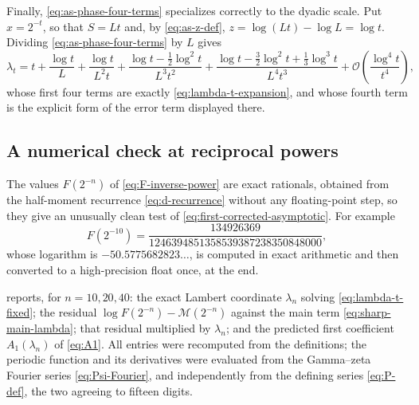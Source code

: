 \documentclass[11pt,oneside]{article}
\theoremstyle{definition}
\theoremstyle{remark}
\newcommand{\bigO}{\mathcal O}
\begin{document}
Finally, \eqref{eq:as-phase-four-terms} specializes correctly to the dyadic scale.  Put
$x=2^{-t}$, so that $S=Lt$ and, by \eqref{eq:as-z-def}, $z=\log(Lt)-\log L=\log t$.  Dividing
\eqref{eq:as-phase-four-terms} by $L$ gives
\begin{equation}
 \lambda_t=t+\frac{\log t}{L}+\frac{\log t}{L^{2}t}
 +\frac{\log t-\tfrac12\log^{2}t}{L^{3}t^{2}}
 +\frac{\log t-\tfrac32\log^{2}t+\tfrac13\log^{3}t}{L^{4}t^{3}}
 +\bigO\!\left(\frac{\log^{4}t}{t^{4}}\right),            \label{eq:as-phase-dyadic}
\end{equation}
whose first four terms are exactly \eqref{eq:lambda-t-expansion}, and whose fourth term is
the explicit form of the error term displayed there.


\subsection{A numerical check at reciprocal powers}
\label{subsec:as-numerics}

The values $F(2^{-n})$ of \eqref{eq:F-inverse-power} are exact rationals, obtained from the
half-moment recurrence \eqref{eq:d-recurrence} without any floating-point step, so they give
an unusually clean test of \eqref{eq:first-corrected-asymptotic}.  For example
\begin{equation}
 F(2^{-10})=\frac{134926369}{1246394851358539387238350848000},  \label{eq:as-F-ten}
\end{equation}
whose logarithm is $-50.5775682823\ldots$, is computed in exact arithmetic and then converted
to a high-precision float once, at the end.

 reports, for $n=10,20,40$: the exact Lambert coordinate $\lambda_n$
solving \eqref{eq:lambda-t-fixed}; the residual $\log F(2^{-n})-\mathcal M(2^{-n})$ against
the main term \eqref{eq:sharp-main-lambda}; that residual multiplied by $\lambda_n$; and the
predicted first coefficient $A_1(\lambda_n)$ of \eqref{eq:A1}.  All entries were recomputed
from the definitions; the periodic function and its derivatives were evaluated from the
Gamma--zeta Fourier series \eqref{eq:Psi-Fourier}, and independently from the defining series
\eqref{eq:P-def}, the two agreeing to fifteen digits.
\end{document}
